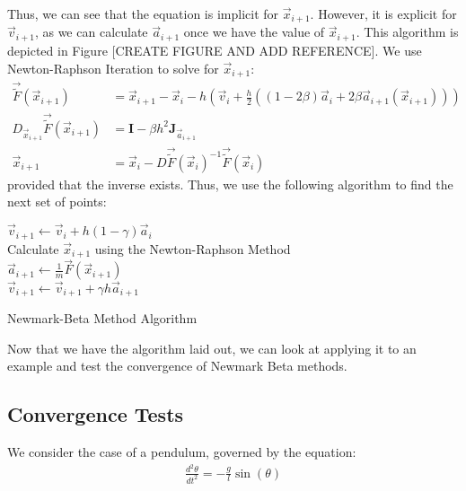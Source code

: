 \documentclass[../Main.tex]{subfiles}
\begin{document}
Thus, we can see that the equation is implicit for $\vec{x}_{i+1}$. However, it is explicit for $\vec{v}_{i+1}$, as we can calculate $\vec{a}_{i+1}$ once we have the value of $\vec{x}_{i+1}$. This algorithm is depicted in Figure [CREATE FIGURE AND ADD REFERENCE]. We use Newton-Raphson Iteration to solve for $\vec{x}_{i+1}$:
\begin{align}
	\vec{\tilde{F}}\left(\vec{x}_{i+1}\right) & = \vec{x}_{i+1} - \vec{x}_{i} -h\left(\vec{v}_{i} + \frac{h}{2}\left(\left(1-2\beta\right)\vec{a}_{i} + 2\beta\vec{a}_{i+1}\left(\vec{x}_{i+1}\right)\right)\right) \nonumber \\
	D_{\vec{x}_{i+1}}\vec{\tilde{F}}\left(\vec{x}_{i+1}\right) & = \textbf{I} -  \beta h^{2}\textbf{J}_{\vec{a}_{i+1}} \nonumber \\
	\vec{x}_{i+1} & = \vec{x}_{i} - D\vec{\tilde{F}}\left(\vec{x}_{i}\right)^{-1}\vec{\tilde{F}}\left(\vec{x}_{i}\right) \label{newton-raphson_final_step}
\end{align}
provided that the inverse exists. Thus, we use the following algorithm to find the next set of points: \\
\begin{algorithm}[H]
\SetAlgoLined
{}

\BlankLine

$\vec{v}_{i+1} \leftarrow \vec{v}_{i} + h\left(1-\gamma\right)\vec{a}_{i}$\\
Calculate $\vec{x}_{i+1}$ using the Newton-Raphson Method \\
$\vec{a}_{i+1} \leftarrow \frac{1}{m}\vec{F}\left(\vec{x}_{i+1}\right)$\\
$\vec{v}_{i+1} \leftarrow \vec{v}_{i+1} + \gamma h\vec{a}_{i+1}$ 
\caption{Newmark-Beta Method Algorithm}
\end{algorithm}
\BlankLine
Now that we have the algorithm laid out, we can look at applying it to an example and test the convergence of Newmark Beta methods.

\subsection{Convergence Tests}

We consider the case of a pendulum, governed by the equation:
\begin{align}
\frac{d^2\theta}{dt^2} = -\frac{g}{l}\sin(\theta)
\end{align}
\end{document}
